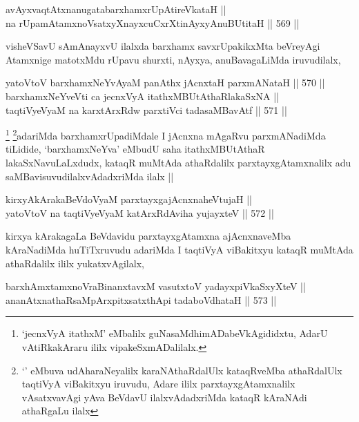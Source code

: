 \begin{shl}
avAyxvaqtAtxnanugatabarxhamxrUpAtireVkataH || \\
na rUpamAtamxnoV\s satxyXnayxcuCxrXtinAyxyAnuBUtitaH ||  569 ||  
\end{shl}

\begin{artha}
visheVSavU sAmAnayxvU ilalxda barxhamx savxrUpakikxMta beVreyAgi
Atamxnige matotxMdu rUpavu shurxti, nAyxya, anuBavagaLiMda
iruvudilalx,  
\end{artha}

\begin{shl}
yatoV\s toV barxhamxNeYvAyaM panAthx jAcnxtaH parxmANataH ||  570 ||  \\
barxhamxNeYveVti ca jecnxVyA itathxMBUtAthaRlakaSxNA || \\
taqtiVyeVyaM na karxtArxRdw parxtiVci tadasaMBavAtf ||  571 ||  
\end{shl} 

\begin{artha}
\footnote{`jecnxVyA itathxM' eMbalilx guNasaMdhimADabeVkAgididxtu,
  AdarU vAtiRkakAraru ililx vipakeSxmADalilalx.}
\footnote{`\stext' eMbuva udAharaNeyalilx karaNAthaRdalUlx kataqRveMba
  athaRdalUlx taqtiVyA viBakitxyu iruvudu, Adare ililx
  parxtayxgAtamxnalilx vAsatxvavAgi yAva BeVdavU ilalxvAdadxriMda
  kataqR kAraNAdi athaRgaLu ilalx}adariMda barxhamxrUpadiMdale I jAcnxna mAgaRvu parxmANadiMda
tiLidide, `barxhamxNeYva' eMbudU saha itathxMBUtAthaR
lakaSxNavuLaLxdudx, kataqR muMtAda athaRdalilx parxtayxgAtamxnalilx
adu saMBavisuvudilalxvAdadxriMda ilalx ||
\end{artha}


\begin{shl}
kirxyAkArakaBeVdoV\s yaM parxtayxgajAcnxnaheVtujaH || \\
yatoV\s toV na taqtiVyeVyaM katArxRdAviha yujayxteV ||  572 ||  
\end{shl}

\begin{artha}
kirxya kArakagaLa BeVdavidu parxtayxgAtamxna ajAcnxnaveMba kAraNadiMda
huTiTxruvudu adariMda I taqtiVyA viBakitxyu kataqR muMtAda athaRdalilx
ililx yukatxvAgilalx, 
\end{artha}

\begin{shl}
barxhAmxtamxnoVraBinanxtavxM vasutxtoV yadayxpiVkaSxyXteV || \\
ananAtxnathaRsaMpArxpitxsatxthA\s pi tadaboVdhataH ||  573 ||   
\end{shl}

